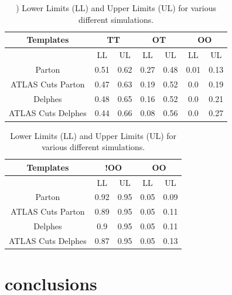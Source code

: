 \documentclass[10pt,twocolumn]{article}
\begin{document}
\begin{table}[h!]
\begin{center}
\begin{tabular}{c |cc|cc|cc}
\hline
Templates & \multicolumn{2}{c|}{TT} & \multicolumn{2}{c|}{OT}  & \multicolumn{2}{c}{OO} \\
\hline
 & LL & UL & LL & UL & LL & UL  \\
\hline
Parton & 0.51 & 0.62 &0.27 & 0.48 &0.01 & 0.13\\ 
ATLAS Cuts Parton & 0.47 & 0.63 &0.19 & 0.52 &0.0 & 0.19\\ 
Delphes & 0.48 & 0.65 &0.16 & 0.52 &0.0 & 0.21\\ 
ATLAS Cuts Delphes & 0.44 & 0.66 &0.08 & 0.56 &0.0 & 0.27\\ 
\hline
\hline
\end{tabular}
\caption{\label{tab:sens}) Lower Limits (LL) and Upper Limits (UL) for various different simulations.}
\end{center}
\end{table}

\begin{table}[h!]
\begin{tabular}{c |cc|cc}
\hline
Templates & \multicolumn{2}{c|}{!OO} & \multicolumn{2}{c}{OO} \\
\hline
 & LL & UL & LL & UL  \\
\hline
Parton & 0.92 & 0.95 &0.05 & 0.09\\ 
ATLAS Cuts Parton & 0.89 & 0.95 &0.05 & 0.11\\ 
Delphes & 0.9 & 0.95 &0.05 & 0.11\\ 
ATLAS Cuts Delphes & 0.87 & 0.95 &0.05 & 0.13\\ 
\hline
\hline
\end{tabular}
\caption{ Lower Limits (LL) and Upper Limits (UL) for various different simulations.}
\end{table}

\section{conclusions}


\begin{thebibliography}{99}

\end{thebibliography}
\end{document}
